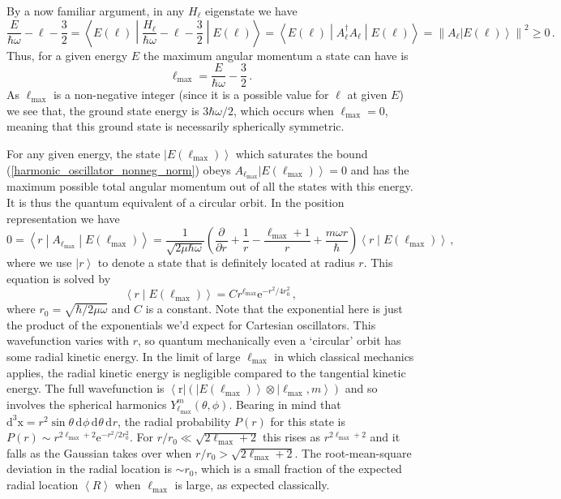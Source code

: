 \documentclass{article}
\theoremstyle{plain}\theoremheaderfont{\normalfont\itshape}\theorembodyfont{\rmfamily}\theoremseparator{.}\newtheorem*{rem}{Remark}\newtheorem*{ex}{Example}\newtheorem*{proof}{Proof}\newtheorem*{altp}{Alternative proof}
\theoremstyle{plain}\theoremheaderfont{\normalfont\bfseries}\theorembodyfont{\rmfamily}\theoremseparator{.}\newtheorem{thm}{Theorem}[section]\newtheorem{lem}[thm]{Lemma}\newtheorem{prop}[thm]{Proposition}\newtheorem*{cor}{Corollary}\newtheorem{defn}[thm]{Definition}\newtheorem{clm}[thm]{Claim}\newtheorem{clminproof}{Claim}
\theoremstyle{break}\theoremheaderfont{\normalfont\itshape}\theorembodyfont{\rmfamily}\theoremseparator{.\medskip}\newtheorem*{proofskip}{Proof}\newtheorem*{exs}{Examples}\newtheorem*{rems}{Remarks}
\theoremstyle{break}\theoremheaderfont{\normalfont\bfseries}\theorembodyfont{\rmfamily}\theoremseparator{.\medskip}\newtheorem{lemskip}[thm]{Lemma}\newtheorem{defnskip}[thm]{Definition}\newtheorem{propskip}[thm]{Proposition}\newtheorem{thmskip}[thm]{Theorem}
\numberwithin{equation}{section}
\newcommand{\ee}{\mathrm{e}}
\newcommand{\dd}[2][]{\mathrm{d}^{#1} #2\,}
\renewcommand{\d}[2][]{\mathrm{d}^{#1} #2}
\newcommand{\pdv}[3][]{\frac{\partial^{#1} #2}{{\partial #3}^{#1}}}
\newcommand{\bra}[1]{\left\langle #1 \right|}
\newcommand{\ket}[1]{\left| #1 \right\rangle}
\newcommand{\braket}[2]{\left\langle #1 \middle| #2 \right\rangle}
\newcommand{\mel}[3]{\left\langle #1 \middle| #2 \middle| #3 \right\rangle}
\newcommand{\eval}[1]{\left\langle #1 \right\rangle}
\newcommand{\expval}[2]{\left\langle #2 \middle| #1 \middle| #2 \right\rangle}
\newcommand{\vb}[1]{\bm{\mathrm{#1}}}
\newcommand{\norm}[1]{\left\| #1 \right\|}
\begin{document}
    By a now familiar argument, in any \(H_\ell\) eigenstate we have
    \begin{equation}\label{harmonic_oscillator_nonneg_norm}
        \frac{E}{\hbar\omega}-\ell-\frac{3}{2}=\expval{\frac{H_\ell}{\hbar\omega}-\ell-\frac{3}{2}}{E(\ell)}=\expval{A_\ell^\dagger A_\ell}{E(\ell)}=\norm{A_\ell\ket{E(\ell)}}^2\ge 0\,.
    \end{equation}
    Thus, for a given energy \(E\) the maximum angular momentum a state can have is
    \begin{equation}
        \ell_{\text{max}}=\frac{E}{\hbar\omega}-\frac{3}{2}\,.
    \end{equation}
    As \(\ell_{\text{max}}\) is a non-negative integer (since it is a possible value for \(\ell\) at given \(E\)) we see that, the ground state energy is \(3\hbar\omega/2\), which occurs when \(\ell_{\text{max}}=0\), meaning that this ground state is necessarily spherically symmetric.

    For any given energy, the state \(\ket{E(\ell_{\text{max}})}\) which saturates the bound (\ref{harmonic_oscillator_nonneg_norm}) obeys \(A_{\ell_{\text{max}}}\ket{E(\ell_{\text{max}})}=0\) and has the maximum possible total angular momentum out of all the states with this energy. It is thus the quantum equivalent of a circular orbit. In the position representation we have
    \begin{equation}
        0=\mel{r}{A_{\ell_{\text{max}}}}{E(\ell_{\text{max}})}=\frac{1}{\sqrt{2\mu\hbar\omega}}\left(\pdv{}{r}+\frac{1}{r}-\frac{\ell_{\text{max}}+1}{r}+\frac{m\omega r}{\hbar}\right)\braket{r}{E(\ell_{\text{max}})}\,,
    \end{equation}
    where we use \(\ket{r}\) to denote a state that is definitely located at radius \(r\). This equation is solved by
    \begin{equation}
        \braket{r}{E(\ell_{\text{max}})}=Cr^{\ell_{\text{max}}}\ee^{-r^2/4r_0^2}\,,
    \end{equation}
    where \(r_0=\sqrt{\hbar/2\mu\omega}\) and \(C\) is a constant. Note that the exponential here is just the product of the exponentials we'd expect for Cartesian oscillators. This wavefunction varies with \(r\), so quantum mechanically even a `circular' orbit has some radial kinetic energy. In the limit of large \(\ell_{\text{max}}\) in which classical mechanics applies, the radial kinetic energy is negligible compared to the tangential kinetic energy. The full wavefunction is \(\bra{\vb{r}}(\ket{E(\ell_{\text{max}})}\otimes\ket{\ell_{\text{max}},m})\) and so involves the spherical harmonics \(Y_{\ell_{\text{max}}}^m (\theta,\phi)\). Bearing in mind that \(\d[3]{\vb{x}}=r^2\sin\theta\,\dd{\phi}\dd{\theta}\d{r}\), the radial probability \(P(r)\) for this state is \(P(r)\sim r^{2\ell_{\text{max}}+2}\ee^{-r^2/2r_0^2}\). For \(r/r_0\ll\sqrt{2\ell_{\text{max}}+2}\) this rises as \(r^{2\ell_{\text{max}}+2}\) and it falls as the Gaussian takes over when \(r/r_0>\sqrt{2\ell_{\text{max}}+2}\). The root-mean-square deviation in the radial location is \(\sim r_0\), which is a small fraction of the expected radial location \(\eval{R}\) when \(\ell_{\text{max}}\) is large, as expected classically.
\end{document}
